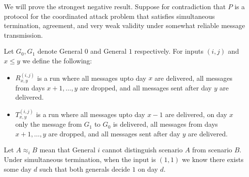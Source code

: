 \documentclass[12pt]{article}
\begin{document}
\begin{solution}
    \bbni

    We will prove the strongest negative result.
    Suppose for contradiction that $P$ is a protocol for the coordinated attack problem that satisfies simultaneous termination, agreement, and very weak validity under somewhat reliable message transmission.

    Let $G_0, G_1$ denote General $0$ and General $1$ respectively. For inputs $(i,j)$ and $x \le y$ we define the following: 
    \begin{itemize}
        \item $R_{x,y}^{(i,j)}$ is a run where all messages upto day $x$ are delivered, all messages from days $x+1, \ldots, y$ are dropped, and all messages sent after day $y$ are delivered.
        \item $T_{x,y}^{(i,j)}$ is a run where all messages upto day $x-1$ are delivered, on day $x$ only the message from $G_1$ to $G_0$ is delivered, all messages from days $x+1, \ldots, y$ are dropped, and all messages sent after day $y$ are delivered.
    \end{itemize} 
    
    Let $A \approx_i B$ mean that General $i$ cannot distinguish scenario $A$ from scenario $B$. Under simultaneous termination, when the input is $(1,1)$ we know there exists some day $d$ such that both generals decide $1$ on day $d$.  
    


\end{solution}
\end{document}
